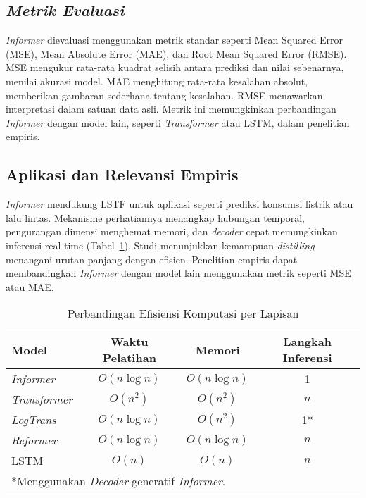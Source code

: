 \subsection{\textit{Metrik Evaluasi}}
\label{sec:evaluation_metrics}

\textit{Informer} dievaluasi menggunakan metrik standar seperti Mean Squared Error (MSE), Mean Absolute Error (MAE), dan Root Mean Squared Error (RMSE). MSE mengukur rata-rata kuadrat selisih antara prediksi dan nilai sebenarnya, menilai akurasi model. MAE menghitung rata-rata kesalahan absolut, memberikan gambaran sederhana tentang kesalahan. RMSE menawarkan interpretasi dalam satuan data asli. Metrik ini memungkinkan perbandingan \textit{Informer} dengan model lain, seperti \textit{Transformer} atau LSTM, dalam penelitian empiris.

\subsection{Aplikasi dan Relevansi Empiris}
\label{sec:informer_application}

\textit{Informer} mendukung LSTF untuk aplikasi seperti prediksi konsumsi listrik atau lalu lintas. Mekanisme perhatiannya menangkap hubungan temporal, pengurangan dimensi menghemat memori, dan \textit{decoder} cepat memungkinkan inferensi real-time (Tabel~\ref{tab:computational_efficiency}). Studi menunjukkan kemampuan \textit{distilling} menangani urutan panjang dengan efisien. Penelitian empiris dapat membandingkan \textit{Informer} dengan model lain menggunakan metrik seperti MSE atau MAE.

\begin{table}[H]
    \centering
    \caption{Perbandingan Efisiensi Komputasi per Lapisan \citep{Zhou2021}}
    \label{tab:computational_efficiency}
    \begin{tabular}{lccc}
        \toprule
        \textbf{Model} & \textbf{Waktu Pelatihan} & \textbf{Memori} & \textbf{Langkah Inferensi} \\
        \midrule
        \textit{Informer} & \( O(n \log n) \) & \( O(n \log n) \) & 1 \\
        \textit{Transformer} & \( O(n^2) \) & \( O(n^2) \) & \( n \) \\
        \textit{LogTrans} & \( O(n \log n) \) & \( O(n^2) \) & 1* \\
        \textit{Reformer} & \( O(n \log n) \) & \( O(n \log n) \) & \( n \) \\
        LSTM & \( O(n) \) & \( O(n) \) & \( n \) \\
        \bottomrule
        \multicolumn{4}{l}{*Menggunakan \textit{Decoder} generatif \textit{Informer}.}
    \end{tabular}
\end{table}

